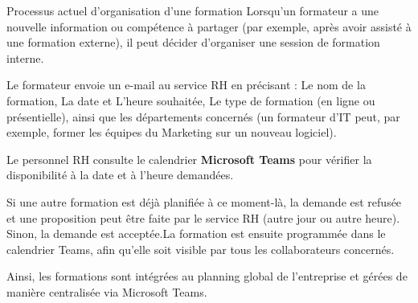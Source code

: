 \documentclass{article}
\begin{document}
\vspace{0,3cm}

\noindent Processus actuel d’organisation d’une formation
Lorsqu’un formateur a une nouvelle information ou compétence à partager (par exemple, après avoir assisté à une formation externe), il peut décider d’organiser une session de formation interne.

\vspace{0,3cm}

\noindent Le formateur envoie un e-mail au service RH en précisant : Le nom de la formation, La date et L’heure souhaitée, Le type de formation (en ligne ou présentielle), ainsi que les départements concernés (un formateur d’IT peut, par exemple, former les équipes du Marketing sur un nouveau logiciel).

\vspace{0,3cm}
\noindent Le personnel RH consulte le calendrier \textbf{Microsoft Teams} pour vérifier la disponibilité à la date et à l’heure demandées.

\vspace{0,3cm}

\noindent Si une autre formation est déjà planifiée à ce moment-là, la demande est refusée et une proposition peut être faite par le service RH  (autre jour ou autre heure). Sinon, la demande est acceptée.La formation est ensuite programmée dans le calendrier Teams, afin qu’elle soit visible par tous les collaborateurs concernés.

\vspace{0,3cm}

\noindent Ainsi, les formations sont intégrées au planning global de l’entreprise et gérées de manière centralisée via Microsoft Teams.
\vspace{0,3cm}
\end{document}
